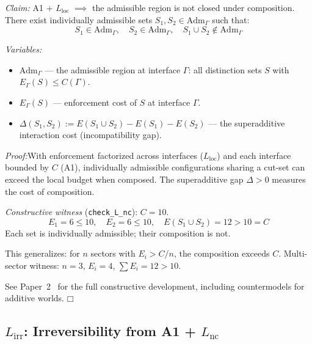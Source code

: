 \documentclass[11pt]{article}
\providecommand{\square}{\ensuremath{\mdlgwhtsquare}}
\newcommand{\Adm}{\mathrm{Adm}}
\newcommand{\Lnc}{L_{\mathrm{nc}}}
\newcommand{\Lloc}{L_{\mathrm{loc}}}
\begin{document}
\begin{tcolorbox}[apfbox, title={Lemma $\Lnc$ (Non-Closure) --- Full Proof}]
\textit{Claim:} A1 $+$ $\Lloc$ $\implies$ the admissible region is not closed under composition.  There exist individually admissible sets $S_1, S_2 \in \Adm_\Gamma$ such that:
\begin{equation}
S_1 \in \Adm_\Gamma, \quad S_2 \in \Adm_\Gamma, \quad S_1 \cup S_2 \notin \Adm_\Gamma
\label{eq:lnc_nonclosure}
\end{equation}

\smallskip\noindent\textit{Variables:}
\begin{itemize}[nosep,leftmargin=2em]
\item $\Adm_\Gamma$ --- the admissible region at interface $\Gamma$: all distinction sets $S$ with $E_\Gamma(S) \le C(\Gamma)$.
\item $E_\Gamma(S)$ --- enforcement cost of $S$ at interface $\Gamma$.
\item $\Delta(S_1, S_2) := E(S_1 \cup S_2) - E(S_1) - E(S_2)$ --- the superadditive interaction cost (incompatibility gap).
\end{itemize}
\end{tcolorbox}

\textit{Proof:}\quad With enforcement factorized across interfaces ($\Lloc$) and each interface bounded by $C$ (A1), individually admissible configurations sharing a cut-set can exceed the local budget when composed.  The superadditive gap $\Delta > 0$ measures the cost of composition.

\textit{Constructive witness} (\texttt{check\_L\_nc}): $C = 10$.
\begin{equation}
E_1 = 6 \le 10, \quad E_2 = 6 \le 10, \quad E(S_1 \cup S_2) = 12 > 10 = C
\end{equation}
Each set is individually admissible; their composition is not.

This generalizes: for $n$ sectors with $E_i > C/n$, the composition exceeds $C$.  Multi-sector witness: $n = 3$, $E_i = 4$, $\sum E_i = 12 > 10$.

See Paper~2~\cite{P2} for the full constructive development, including countermodels for additive worlds. \hfill$\square$


\subsection{\texorpdfstring{$L_{\mathrm{irr}}$}{Lirr}: Irreversibility from A1 + \texorpdfstring{$L_{\mathrm{nc}}$}{Lnc}}
\end{document}
